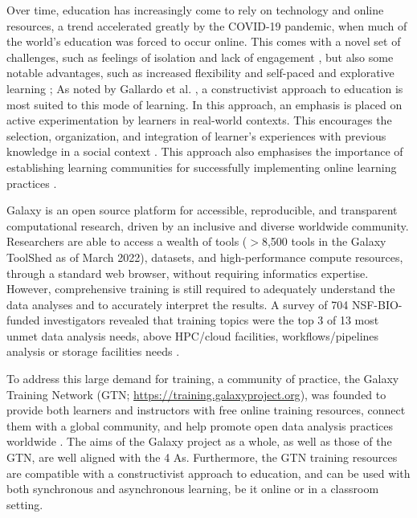 Over time, education has increasingly come to rely on technology and online resources, a trend accelerated greatly by the COVID-19 pandemic, when much of the world's education was forced to occur online. This comes with a novel set of challenges, such as feelings of isolation and lack of engagement \cite{Bambara2009,hara1999case,jaggars2014choosing,xu2014performance}, but also some notable advantages, such as increased flexibility \cite{SerranoSolano2020} and self-paced and explorative learning \cite{huang2002toward,liaw2004considerations}; As noted by Gallardo et al. \cite{GallardoAlba2021}, a constructivist approach to education is most suited to this mode of learning. In this approach, an emphasis is placed on active experimentation by learners in real-world contexts. This encourages the selection, organization, and integration of learner's experiences with previous knowledge in a social context \cite{bangert2006development}. This approach also emphasises the importance of establishing learning communities for successfully implementing online learning practices \cite{garrison1999critical}.

Galaxy \cite{Jalili2020} is an open source platform for accessible, reproducible, and transparent computational research, driven by an inclusive and diverse worldwide community.
Researchers are able to access a wealth of tools ($>$8,500 tools in the Galaxy ToolShed \cite{galaxy-toolshed} as of March 2022), datasets, and high-performance compute resources, through a standard web browser, without requiring informatics expertise. 
However, comprehensive training is still required to adequately understand the data analyses and to accurately interpret the results. A survey of 704 NSF-BIO-funded investigators revealed that training topics were the top 3 of 13 most unmet data analysis needs, above HPC/cloud facilities, workflows/pipelines analysis or storage facilities needs \cite{Barone2017}.

To address this large demand for training, a community of practice, the Galaxy Training Network (GTN; \url{https://training.galaxyproject.org}), was founded to provide both learners and instructors with free online training resources, connect them with a global community, and help promote open data analysis practices worldwide \cite{Batut2018}. The aims of the Galaxy project as a whole, as well as those of the GTN, are well aligned with the 4 As. Furthermore, the GTN training resources are compatible with a constructivist approach to education, and can be used with both synchronous and asynchronous learning, be it online or in a classroom setting.

